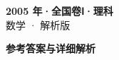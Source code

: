\documentclass[zihao=-4, a4paper]{ctexart}
\begin{document}
\begin{center}
  {\Large\bfseries 2005 年·全国卷Ⅰ·理科}\\[4pt]
  {\large 数学 · 解析版}
\end{center}
\medskip
{}

\clearpage
{}
\begin{center}{\Large\bfseries 参考答案与详细解析}\end{center}
\medskip

\end{document}
